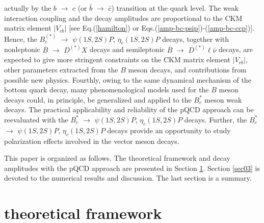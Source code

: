 \documentclass[preprint,superscriptaddress,nofootinbib]{revtex4}
\begin{document}
  actually by the $b$ ${\to}$ $c$ (or $\bar{b}$ ${\to}$ $\bar{c}$) transition at the
  quark level. The weak interaction coupling and the decay amplitudes are proportional
  to the CKM matrix element ${\vert}V_{cb}{\vert}$
  [see Eq.(\ref{hamilton}) or Eqs.(\ref{amp-bc-psip})-(\ref{amp-bc-ccp})].
  Hence, the $B_{c}^{(\ast)}$ ${\to}$ ${\psi}(1S,2S)P$, ${\eta}_{c}(1S,2S)P$
  decays, together with nonleptonic $\overline{B}$ ${\to}$ $D^{(\ast)}X$ decays and semileptonic
  $\overline{B}$ ${\to}$ $D^{(\ast)}{\ell}\bar{\nu}$ decays, are expected to give more
  stringent constraints on the CKM matrix element ${\vert}V_{cb}{\vert}$,
  other parameters extracted from the $B$ meson decays,
  and contributions from possible new physics.
  Fourthly, owing to the same dynamical mechanism of the bottom quark
  decay, many phenomenological models used for the $B$ meson decays could,
  in principle, be generalized and applied to the $B_{c}^{\ast}$ meson weak decays.
  The practical applicability and reliability of the pQCD approach
  can be reevaluated with the $B_{c}^{\ast}$ ${\to}$ ${\psi}(1S,2S)P$,
  ${\eta}_{c}(1S,2S)P$ decays.
  Further, the $B_{c}^{\ast}$ ${\to}$ ${\psi}(1S,2S)P$, ${\eta}_{c}(1S,2S)P$
  decays provide an opportunity to study polarization effects
  involved in the vector meson decays.

  This paper is organized as follows.
  The theoretical framework and decay amplitudes with the pQCD approach
  are presented in Section \ref{sec02}.
  Section \ref{sec03} is devoted to the numerical results and discussion.
  The last section is a summary.

  \section{theoretical framework}
  \label{sec02}
\end{document}
